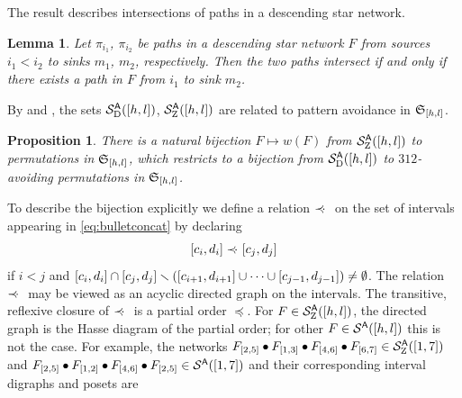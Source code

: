 \documentclass[11pt]{article}
\newtheorem{lem}[theo]{Lemma}
\newtheorem{prop}[theo]{Proposition}
\theoremstyle{definition}
\numberwithin{equation}{section}
\begin{document}
The result \cite[Lem.\,3.5]{CHSSkanEKL}
describes intersections of paths in a descending star network.
\begin{lem}\label{l:lemma3.5}
  Let $\pi_{i_1}$, $\pi_{i_2}$ be paths in a descending star network $F$
  from sources $i_1 < i_2$ to sinks $m_1$, $m_2$, respectively.
  Then the two paths intersect if and only if there exists a path in $F$
  from $i_1$ to sink $m_2$.
  \end{lem}

By \cite[Thm.\,3.5, Lem.\,5.3]{SkanNNDCB}
and \cite[Thm.\,3.6]{CHSSkanEKL},
the sets
$\mathcal S^{\mathsf{A}}_{\mathrm D}([h,l])$, $\mathcal S^{\mathsf{A}}_{\mathrm Z}([h,l])$
are related to pattern avoidance in $\mathfrak{S}_{[h,l]}$.
\begin{prop}\label{p:anetpavoid}
There is a natural bijection $F \mapsto w(F)$ from 
$\mathcal S^{\mathsf{A}}_{\mathrm Z}([h,l])$
to \pavoiding permutations in $\mathfrak{S}_{[h,l]}$,
which restricts to a bijection from $\mathcal S^{\mathsf{A}}_{\mathrm D}([h,l])$ to
$312$-avoiding permutations in $\mathfrak{S}_{[h,l]}$.
\end{prop}
To describe
the bijection
explicitly
we
define
a relation $\prec \negthickspace \negthinspace \cdot\ $
on the set of intervals appearing in \eqref{eq:bulletconcat}
by
declaring
\begin{equation}\label{eq:precdotdef}
  [c_i,d_i] \precdot [c_j,d_j]
  \end{equation}
if 
$i < j$ and
$[c_i,d_i] \cap [c_j,d_j] \smallsetminus ( [c_{i+1},d_{i+1}] \cup \cdots \cup [c_{j-1},d_{j-1}]) \neq \emptyset$.
  The relation $\prec \negthickspace \negthinspace \cdot\ $ may be viewed as an acyclic directed graph on 
  the intervals.
  The transitive, reflexive closure of $\prec \negthickspace \negthinspace \cdot\ $ is a partial order $\preceq$.
  For $F \in \mathcal S^{\mathsf{A}}_{\mathrm Z}([h,l])$, the directed graph is the Hasse diagram
  of the partial order; for other $F \in \mathcal S^{\mathsf{A}}([h,l])$ this is not the case.
  For example, the networks
  $F_{[2,5]} \bullet F_{[1,3]} \bullet F_{[4,6]} \bullet F_{[6,7]}
  \in \mathcal S^{\mathsf{A}}_{\mathrm Z}([1,7])$
  and
  $F_{[2,5]} \bullet F_{[1,2]} \bullet F_{[4,6]} \bullet F_{[2,5]}
  \in \mathcal S^{\mathsf{A}}([1,7])$
and their corresponding interval digraphs and posets are
\end{document}

